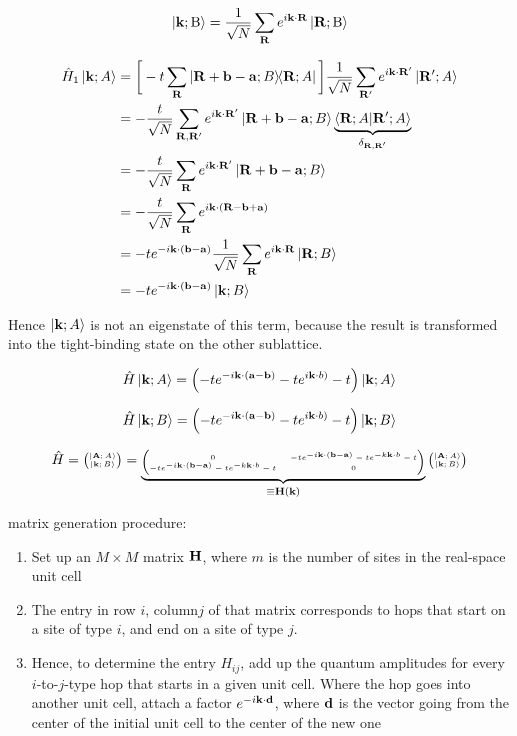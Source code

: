 \documentclass[10pt, a4paper, twocolumn]{article}
\begin{document}
\[\ket{\vb k;\mathrm B}
=\frac{1}{\sqrt N}
\sum _{\vb R}e^{i\vb k\cdot \vb R}
\ket{\vb R;\mathrm B} \]

\begin{equation*}
\begin{aligned}
\hat H_1\ket{\vb k; A} &=
\bigg[ -t\sum _{\vb R}
\dyad{\vb R+\vb b-\vb a;B}{\vb R;A} \bigg]
\frac{1}{\sqrt N}\sum_{\vb R'}
e^{i\vb k\cdot \vb R'}\ket{\vb R';A}
\\&=-\frac{t}{\sqrt N}\sum_{\vb R,\vb R'}
e^{i\vb k\cdot \vb R'}
\ket{\vb R+\vb b - \vb a;B}
\underbrace{\ip{\vb R;A}{\vb R';A}}
_{\delta _{\vb R, \vb R'}}
\\&=-\frac{t}{\sqrt N}\sum_{\vb R}
e^{i\vb k\cdot \vb R'}
\ket{\vb R+\vb b - \vb a;B}
\\&=-\frac{t}{\sqrt N}\sum_{\vb R}
e^{i\vb k\cdot (\vb R-\vb b+\vb a)}
\\&=-te^{-i\vb k\cdot (\vb b-\vb a)}\frac{1}{\sqrt N}
\sum _{\vb R} e^{i\vb k\cdot \vb R} \ket{\vb R;B}
\\&=-te^{-i\vb k\cdot (\vb b-\vb a)} \ket{\vb k;B}
\end{aligned}
\end{equation*}

Hence $\ket{\vb k;A}$ is not an eigenstate of this term, because the result is transformed into the tight-binding state on the other sublattice.

\[\hat H \ket{\vb k;A}
=\left( -te^{-i\vb k\cdot (\vb a-\vb b)}
-te^{i\vb k \cdot b)} - t\right)
\ket{\vb k;A} \]

\[\hat H \ket{\vb k;B}
=\left( -te^{-i\vb k\cdot (\vb a-\vb b)}
-te^{i\vb k \cdot b)} - t\right)
\ket{\vb k;B} \]

\[
\hat H = \tiny{\pmqty{\ket{\vb A;A}\\ \ket{\vb k;B}}}
=\underbrace{\tiny{\begin{pmatrix}
0&-te^{-i\vb k\cdot (\vb b - \vb a)}
-te^{-k\vb k\cdot b}-t
\\-te^{-i\vb k\cdot (\vb b - \vb a)}
-te^{-k\vb k\cdot b}-t &0 \end{pmatrix}}}
_{\equiv \vb H(\vb k)}
\pmqty{\ket{\vb A;A}\\ \ket{\vb k;B}}
\]

matrix generation procedure:
\begin{enumerate}
\item Set up an $M\times M$ matrix $\vb H$, where $m$ is the number of sites in the real-space unit cell
\item The entry in row $i$, column$j$ of that matrix corresponds to hops that start on a site of type $i$, and end on a site of type $j$.
\item Hence, to determine the entry $H_{ij}$, add up the quantum amplitudes for every $i$-to-$j$-type hop that starts in a given unit cell. Where the hop goes into another unit cell, attach a factor $e^{-i\vb k\cdot \vb d}$, where $\vb d$ is the vector going from the center of the initial unit cell to the center of the new one 
\end{enumerate}
\end{document}
